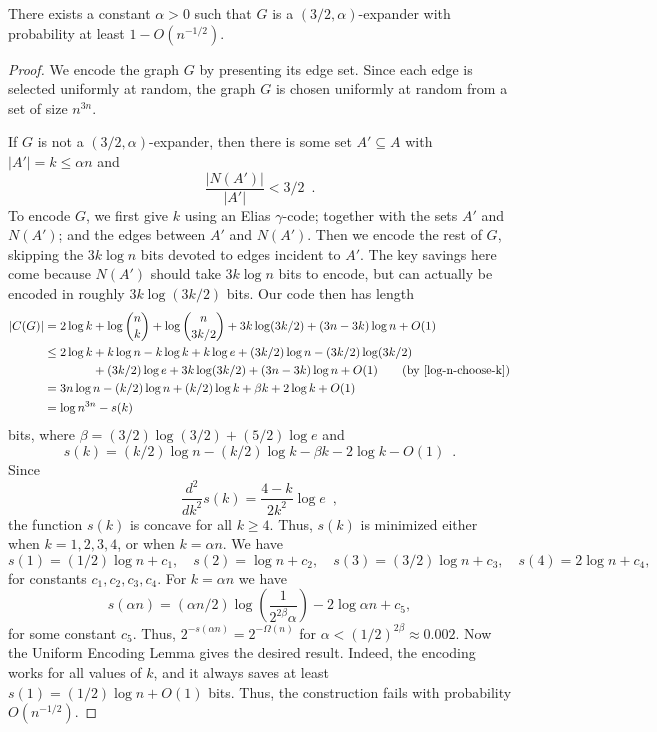 \documentclass[format=acmsmall, review=false, screen=true]{acmart}
\begin{document}
\begin{thm}
  There exists a constant $\alpha >0$ such that $G$ is a
  $(3/2,\alpha)$-expander with probability at least $1 - O(n^{-1/2})$.
\end{thm}

\begin{proof}
  We encode the graph $G$ by presenting its edge set. Since each edge
  is selected uniformly at random, the graph $G$ is chosen uniformly at
  random from a set of size $n^{3n}$.
  
  If $G$ is not a $(3/2, \alpha)$-expander, then there is some set $A'
  \subseteq A$ with $|A'|=k\le \alpha n$ and
  \[
  \frac{|N(A')|}{|A'|} < 3/2 \enspace .
  \]
  To encode $G$, we first give $k$ using an Elias $\gamma$-code; together 
  with the sets $A'$ and $N(A')$; and the edges between $A'$ and
  $N(A')$. Then we encode the rest of $G$, skipping the $3k\log n$
  bits devoted to edges incident to $A'$.  The key savings here come 
  because
  $N(A')$ should take $3k\log n$ bits to encode, but can actually be
  encoded in roughly $3k\log(3k/2)$ bits. Our code then has length
  \begin{align*}
    |C(G)| &= 2\log k + \log {n \choose k} + \log {n \choose 3k/2} + 3k \log (3k/2) + (3n - 3k) \log n + O(1) \\
           &\le 2\log k + k\log n - k\log k + k\log e + (3k/2)\log n - (3k/2) \log (3k/2) \\
           & \hphantom{{}=2\log k} + (3k/2) \log e + 3k \log (3k/2) + (3n - 3k) \log n + O(1) \tag{by \eqref{log-n-choose-k}} \\
           &= 3n\log n - (k/2)\log n + (k/2)\log k + \beta k + 2\log k + O(1) \\
           &= \log n^{3n} - s(k)
  \end{align*}
  bits, where $\beta = (3/2) \log (3/2) + (5/2) \log e$ and
  \[
  s(k) = (k/2)\log n - (k/2)\log k - \beta k -
  2 \log k - O(1) \enspace.
  \]
  Since
  \[
    \frac{d^2}{dk^2} s(k) = \frac{4 - k}{2 k^2} \log e \enspace ,
  \]
  the function $s(k)$ is concave for all $k \geq 4$. Thus, $s(k)$ is
  minimized either when $k = 1, 2, 3, 4$, or when $k = \alpha n$. We have
  \[
    s(1) = (1/2)\log n + c_1,  \quad
    s(2) = \log n + c_2, \quad
    s(3) = (3/2) \log n + c_3, \quad 
    s(4) = 2 \log n + c_4, 
  \]
  for constants $c_1, c_2, c_3, c_4$. For $k=\alpha n$ we have
  \[
    s(\alpha n) = (\alpha n/2)\log \left(\frac{1}{2^{2\beta}
        \alpha}\right) - 2 \log \alpha n + c_5,
  \]
  for some constant $c_5$.
  Thus, $2^{-s(\alpha n)} = 2^{-\varOmega(n)}$ for
  $\alpha < (1/2)^{2\beta} \approx 0.002$. Now the Uniform Encoding
  Lemma gives the desired result. Indeed, the encoding works
  for all values of $k$, and it always saves at least 
  $s(1) = (1/2)\log n + O(1)$ bits.
  Thus, the construction fails with probability
  $O(n^{-1/2})$.
\end{proof}
\end{document}

